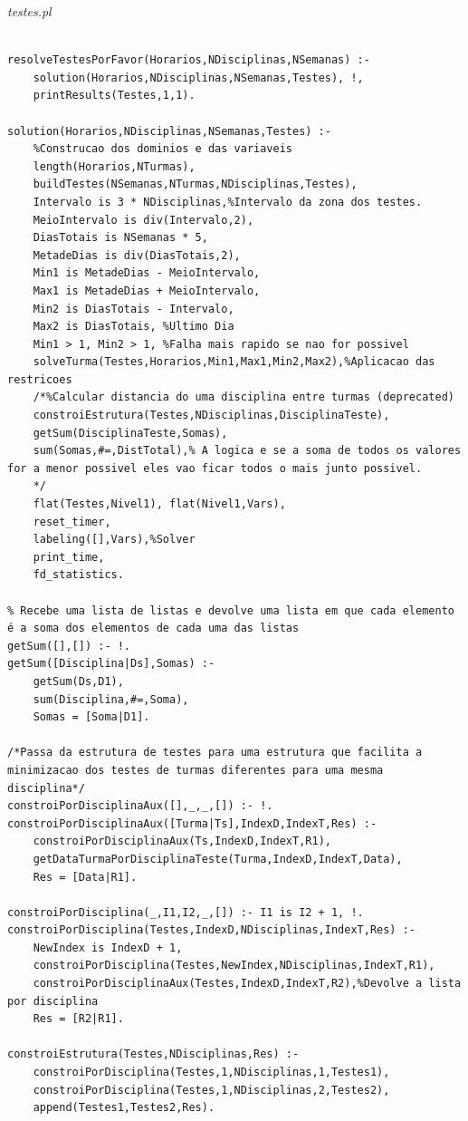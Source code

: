 \documentclass{llncs}
\newenvironment{changemargin}[2]{%
\begin{list}{}{%
\setlength{\topsep}{0pt}%
\setlength{\leftmargin}{#1}%
\setlength{\rightmargin}{#2}%
\setlength{\listparindent}{\parindent}%
\setlength{\itemindent}{\parindent}%
\setlength{\parsep}{\parskip}%
}%
\item[]}{
\end{list}}
\begin{document}
\noindent
{\it testes.pl}
\begin{changemargin}{-3cm}{-4cm}
\begin{verbatim}

resolveTestesPorFavor(Horarios,NDisciplinas,NSemanas) :-
    solution(Horarios,NDisciplinas,NSemanas,Testes), !,
    printResults(Testes,1,1).

solution(Horarios,NDisciplinas,NSemanas,Testes) :-
    %Construcao dos dominios e das variaveis
    length(Horarios,NTurmas),
    buildTestes(NSemanas,NTurmas,NDisciplinas,Testes),
    Intervalo is 3 * NDisciplinas,%Intervalo da zona dos testes.
    MeioIntervalo is div(Intervalo,2),
    DiasTotais is NSemanas * 5,
    MetadeDias is div(DiasTotais,2),
    Min1 is MetadeDias - MeioIntervalo,
    Max1 is MetadeDias + MeioIntervalo,
    Min2 is DiasTotais - Intervalo,
    Max2 is DiasTotais, %Ultimo Dia
    Min1 > 1, Min2 > 1, %Falha mais rapido se nao for possivel
    solveTurma(Testes,Horarios,Min1,Max1,Min2,Max2),%Aplicacao das restricoes
    /*%Calcular distancia do uma disciplina entre turmas (deprecated)
    constroiEstrutura(Testes,NDisciplinas,DisciplinaTeste),
    getSum(DisciplinaTeste,Somas),
    sum(Somas,#=,DistTotal),% A logica e se a soma de todos os valores for a menor possivel eles vao ficar todos o mais junto possivel.
    */
    flat(Testes,Nivel1), flat(Nivel1,Vars),
    reset_timer,
    labeling([],Vars),%Solver
    print_time,
    fd_statistics.

% Recebe uma lista de listas e devolve uma lista em que cada elemento é a soma dos elementos de cada uma das listas
getSum([],[]) :- !.
getSum([Disciplina|Ds],Somas) :-
    getSum(Ds,D1),
    sum(Disciplina,#=,Soma),
    Somas = [Soma|D1].

/*Passa da estrutura de testes para uma estrutura que facilita a minimizacao dos testes de turmas diferentes para uma mesma disciplina*/
constroiPorDisciplinaAux([],_,_,[]) :- !.
constroiPorDisciplinaAux([Turma|Ts],IndexD,IndexT,Res) :-
    constroiPorDisciplinaAux(Ts,IndexD,IndexT,R1),
    getDataTurmaPorDisciplinaTeste(Turma,IndexD,IndexT,Data),
    Res = [Data|R1].

constroiPorDisciplina(_,I1,I2,_,[]) :- I1 is I2 + 1, !.
constroiPorDisciplina(Testes,IndexD,NDisciplinas,IndexT,Res) :-
    NewIndex is IndexD + 1,
    constroiPorDisciplina(Testes,NewIndex,NDisciplinas,IndexT,R1),
    constroiPorDisciplinaAux(Testes,IndexD,IndexT,R2),%Devolve a lista por disciplina
    Res = [R2|R1].

constroiEstrutura(Testes,NDisciplinas,Res) :-
    constroiPorDisciplina(Testes,1,NDisciplinas,1,Testes1),
    constroiPorDisciplina(Testes,1,NDisciplinas,2,Testes2),
    append(Testes1,Testes2,Res).


\end{verbatim}
\end{changemargin}
\end{document}
